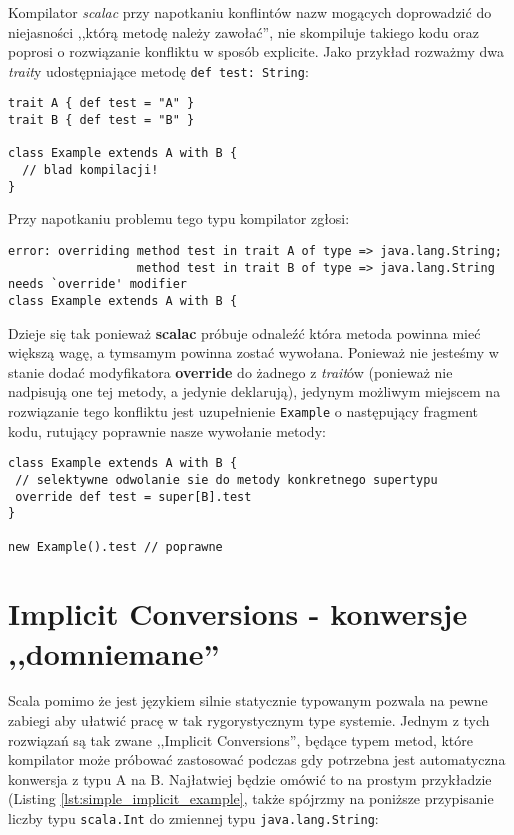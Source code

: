 Kompilator \textit{scalac} przy napotkaniu konflintów nazw mogących doprowadzić do niejasności ,,którą metodę należy zawołać'', nie skompiluje takiego kodu
oraz poprosi o rozwiązanie konfliktu w sposób explicite. Jako przykład rozważmy dwa \textit{trait}y udostępniające metodę \verb|def test: String|:

\begin{lstlisting}
trait A { def test = "A" }
trait B { def test = "B" }

class Example extends A with B {
  // blad kompilacji!
}
\end{lstlisting}

Przy napotkaniu problemu tego typu kompilator zgłosi:
\begin{verbatim}
error: overriding method test in trait A of type => java.lang.String;
                  method test in trait B of type => java.lang.String needs `override' modifier
class Example extends A with B {
\end{verbatim}

Dzieje się tak ponieważ \textbf{scalac} próbuje odnaleźć która metoda powinna mieć większą wagę, a tymsamym powinna zostać wywołana.
Ponieważ nie jesteśmy w stanie dodać modyfikatora \textbf{override} do żadnego z \textit{trait}ów (ponieważ nie nadpisują one tej metody, a jedynie deklarują),
jedynym możliwym miejscem na rozwiązanie tego konfliktu jest uzupełnienie \verb|Example| o następujący fragment kodu, rutujący poprawnie nasze wywołanie metody:

\begin{lstlisting}
class Example extends A with B {
 // selektywne odwolanie sie do metody konkretnego supertypu
 override def test = super[B].test
}

new Example().test // poprawne
\end{lstlisting}


\section{Implicit Conversions - konwersje ,,domniemane''}
\label{sec:implicit}
Scala pomimo że jest językiem silnie statycznie typowanym pozwala na pewne zabiegi aby ułatwić pracę w tak rygorystycznym type systemie.
Jednym z tych rozwiązań są tak zwane ,,Implicit Conversions'', będące typem metod, które kompilator może próbować zastosować podczas gdy 
potrzebna jest automatyczna konwersja z typu A na B. Najłatwiej będzie omówić to na prostym przykładzie (Listing \ref{lst:simple_implicit_example},
także spójrzmy na poniższe przypisanie liczby typu \verb|scala.Int| do zmiennej typu \verb|java.lang.String|:

